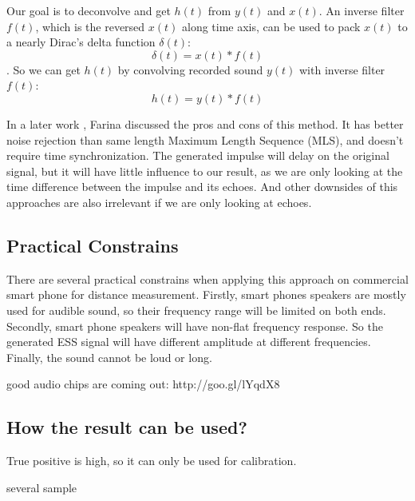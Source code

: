 Our goal is to deconvolve and get $h(t)$ from $y(t)$ and $x(t)$. An inverse filter $f(t)$, which is the reversed $x(t)$ along
time axis, can be used to pack $x(t)$ to a nearly Dirac's delta function $\delta(t)$:
\begin{equation}
\delta(t) = x(t) \ast f(t)
\end{equation}
. So we can get $h(t)$ by convolving recorded sound $y(t)$ with inverse filter $f(t)$:
\begin{equation}
h(t) = y(t) \ast f(t)
\end{equation}


In a later work \cite{farina2007advancements}, Farina discussed the pros and cons of this method. 
It has better noise rejection than same length Maximum Length Sequence (MLS), and doesn't require 
time synchronization. The generated impulse will delay on the original signal, but it will 
have little influence to our result, as 
we are only looking at the time difference between the impulse and its echoes. 
And other downsides of this approaches are also irrelevant if we are only looking at echoes. 




\subsection{Practical Constrains}

There are several practical constrains when applying this approach on commercial smart phone for distance measurement. 
Firstly, smart phones speakers are mostly used for audible sound, so their frequency range will be limited on both ends. 
Secondly, smart phone speakers will have non-flat frequency response. So the generated ESS signal will 
have different amplitude at different frequencies. Finally, the sound cannot be loud or long.



good audio chips are coming out:  http://goo.gl/lYqdX8


\subsection{How the result can be used?}

True positive is high, so it can only be used for calibration.


several sample



